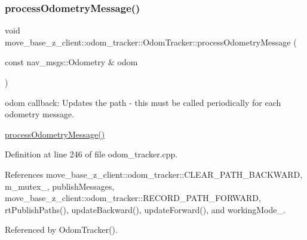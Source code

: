 \subsubsection{\texorpdfstring{process\+Odometry\+Message()}{processOdometryMessage()}}
{\footnotesize\ttfamily void move\+\_\+base\+\_\+z\+\_\+client\+::odom\+\_\+tracker\+::\+Odom\+Tracker\+::process\+Odometry\+Message (\begin{DoxyParamCaption}\item[{const nav\+\_\+msgs\+::\+Odometry \&}]{odom }\end{DoxyParamCaption})\hspace{0.3cm}{\ttfamily [virtual]}}



odom callback\+: Updates the path -\/ this must be called periodically for each odometry message. 

\hyperlink{classmove__base__z__client_1_1odom__tracker_1_1OdomTracker_a79b9f1e3b15fa6ac82dd93ab78e23579}{process\+Odometry\+Message()} 

Definition at line 246 of file odom\+\_\+tracker.\+cpp.



References move\+\_\+base\+\_\+z\+\_\+client\+::odom\+\_\+tracker\+::\+C\+L\+E\+A\+R\+\_\+\+P\+A\+T\+H\+\_\+\+B\+A\+C\+K\+W\+A\+RD, m\+\_\+mutex\+\_\+, publish\+Messages, move\+\_\+base\+\_\+z\+\_\+client\+::odom\+\_\+tracker\+::\+R\+E\+C\+O\+R\+D\+\_\+\+P\+A\+T\+H\+\_\+\+F\+O\+R\+W\+A\+RD, rt\+Publish\+Paths(), update\+Backward(), update\+Forward(), and working\+Mode\+\_\+.



Referenced by Odom\+Tracker().


